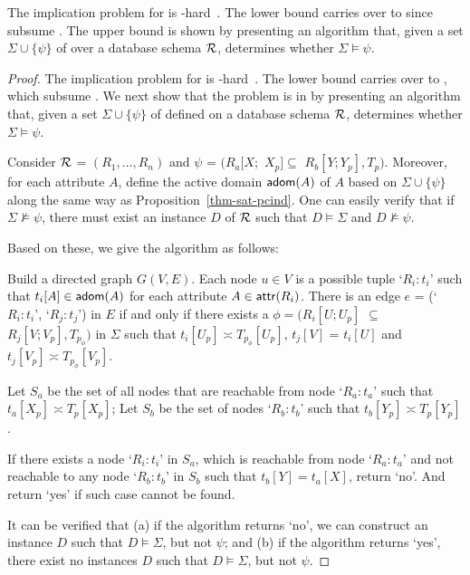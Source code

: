 \proofs The implication problem for \CINDs is
\EXPTIME-hard~\cite{CINDs}. The lower bound carries over to \pCINDs
since \pCINDs subsume \CINDs. The \EXPTIME upper bound is shown
by presenting an \EXPTIME algorithm that, given a set
$\Sigma\cup\{\psi\}$ of \pCINDs over a database schema $\cal R$,
determines whether $\Sigma\models\psi$. \eop

\begin{proof} The implication problem for \CINDs is
\EXPTIME-hard~\cite{CINDs}. The lower bound carries over to \pCINDs,
which subsume \CINDs. We next show that the problem is in \EXPTIME
by presenting an \EXPTIME algorithm that, given a set
$\Sigma\cup\{\psi\}$ of \pCINDs defined on a database schema $\cal
R$, determines whether $\Sigma\models\psi$.

Consider $\cal R$ = $(R_1,\ldots,R_n)$ and $\psi$ = $(R_a[X;$ $X_p]
\subseteq$ $R_b[Y;Y_p], T_p)$. Moreover, for each attribute $A$,
define the active domain ${\mathsf{adom}}(A)$ of $A$ based on
$\Sigma\cup\{\psi\}$ along the same way as
Proposition~\ref{thm-sat-pcind}. One can easily verify that if
$\Sigma\not\models\psi$, there must exist an instance $D$ of ${\cal
R}$ such that $D\models\Sigma$ and $D\not\models\psi$.

Based on these, we give the \EXPTIME algorithm as follows:

\bi
\item
Build a directed graph $G(V, E)$.  Each node $u\in V$ is a possible
tuple `$R_i:t_i$' such that $t_i[A]\in {\ensuremath {\mathsf{adom}}}(A)$ for each attribute
$A\in\protect\mathsf{attr}(R_i)$. There is an edge $e$ = (`$R_i:t_i$',
`$R_j:t_j$') in $E$ if and only if there exists a \pCIND $\phi =
(R_i[U; U_p]$ $\subseteq$ $ R_j[V; V_p], T_{p_{\phi}})$ in $\Sigma$
such that $t_i[U_p] \asymp T_{p_{\phi}}[U_p]$, $t_j[V]$ = $t_i[U]$
and $t_j[V_p] \asymp T_{p_{\phi}}[V_p]$.
\item
Let $S_a$ be the set of all nodes that are reachable from node
`$R_a:t_a$' such that $t_a[X_p] \asymp T_{p}[X_p]$;
 Let $S_b$ be the
set of nodes `$R_b:t_b$' such that $t_b[Y_p] \asymp T_{p}[Y_p]$.
\item
If there exists a node `$R_i:t_i$' in $S_a$, which is reachable from
node `$R_a:t_a$' and not reachable to any node `$R_b:t_b$' in $S_b$
such that $t_b[Y] = t_a[X]$, return `no'. And return `yes' if such
case cannot be found. \ei


It can be verified that (a) if the algorithm returns `no', we can
construct an instance $D$ such that $D\models\Sigma$, but not
$\psi$; and (b) if the algorithm returns `yes', there exist no
instances $D$ such that $D\models\Sigma$, but not $\psi$.


\end{proof}
